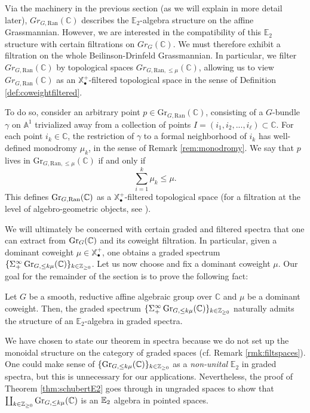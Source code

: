 Via the machinery in the previous section (as we will explain in more detail later), $Gr_{G,\text{Ran}}(\mathbb{C})$ describes the $\mathbb{E}_2$-algebra structure on the affine Grassmannian.  However, we are interested in the compatibility of this $\mathbb{E}_2$ structure with certain filtrations on $Gr_G(\mathbb{C})$.  We must therefore exhibit a filtration on the whole Beilinson-Drinfeld Grassmannian.  In particular, we filter $Gr_{G,\text{Ran}}(\mathbb{C})$ by topological spaces $Gr_{G,\text{Ran},\le \mu}(\mathbb{C})$, allowing us to view $Gr_{G,\text{Ran}}(\mathbb{C})$ as an $\mathbb{X}_{\bullet}^+$-filtered topological space in the sense of Definition \ref{def:coweightfiltered}.  

To do so, consider an arbitrary point $p \in \text{Gr}_{G,\text{Ran}}(\mathbb{C})$, consisting of a $G$-bundle $\gamma$ on $\mathbb{A}^1$ trivialized away from a collection of points $I=(i_1,i_2,...,i_\ell) \subset \mathbb{C}$.  For each point $i_k \in \mathbb{C}$, the restriction of $\gamma$ to a formal neighborhood of $i_k$ has well-defined monodromy $\mu_k$, in the sense of Remark \ref{rem:monodromy}.  We say that $p$ lives in $\text{Gr}_{G,\text{Ran},\le \mu}(\mathbb{C})$ if and only if
$$\sum_{i=1}^{k} \mu_k \le \mu.$$  This defines $\operatorname{\mathrm{Gr}}_{G,\operatorname{\mathrm{Ran}}}(\mathbb{C})$ as a $\mathbb{X}^+_{\bullet}$-filtered topological space (for a filtration at the level of algebro-geometric objects, see \cite[3.1.11]{Zhu}).

We will ultimately be concerned with certain graded and filtered spectra that one can extract from $\operatorname{\mathrm{Gr}}_{G}(\mathbb{C})$ and its coweight filtration.  In particular, given a dominant coweight $\mu \in \mathbb{X}^+_{\bullet}$, one obtains a graded spectrum $ \{ \Sigma^{\infty}_+ \operatorname{\mathrm{Gr}}_{G,\leq k\mu}(\mathbb{C})\}_{k\in \mathbb{Z}_{\geq 0}}$.  Let us now choose and fix a dominant coweight $\mu$. Our goal for the remainder of the section is to prove the following fact:

\begin{thm}\label{thm:schubertE2}
Let $G$ be a smooth, reductive affine algebraic group over $\mathbb{C}$ and $\mu$ be a dominant coweight.  Then, the graded spectrum $\{\Sigma^{\infty}_+ \operatorname{\mathrm{Gr}}_{G, \leq k \mu}(\mathbb{C}) \}_{k\in \mathbb{Z}_{\geq 0}}$ naturally admits the structure of an $\mathbb{E}_2$-algebra in graded spectra. 
\end{thm}

\begin{rmk}\label{rmk:choosespectra}
We have chosen to state our theorem in spectra because we do not set up the monoidal structure on the category of graded spaces (cf. Remark \ref{rmk:filtspaces}).  One could make sense of $\{ \operatorname{\mathrm{Gr}}_{G,\leq k \mu}(\mathbb{C}) \}_{k\in \mathbb{Z}_{\geq 0}}$ as a \emph{non-unital} $\mathbb{E}_2$ in graded spectra, but this is unnecessary for our applications.  Nevertheless, the proof of Theorem \ref{thm:schubertE2} goes through in ungraded spaces to show that $\coprod_{k\in \mathbb{Z}_{\geq 0}} \operatorname{\mathrm{Gr}}_{G,\leq  k\mu}(\mathbb{C})$ is an $\operatorname{\mathbb{E}}_2$ algebra in pointed spaces.  
\end{rmk}

